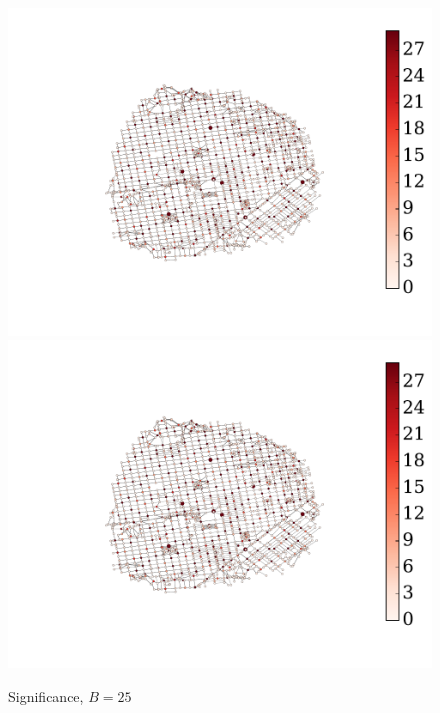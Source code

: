 \begin{figure} \caption{Significance, $B=25$}\label{fig:sig_colapse}
\begin{center}
\includegraphics[clip, trim=3.7cm 2.9cm 4.2cm 3cm,scale=0.8]{TexImg/sig_colapse.pdf}
\includegraphics[clip, trim=15cm 1.5cm 0.1cm 0.8cm,scale=0.45]{TexImg/sig_colapse.pdf}
\end{center}
\end{figure}